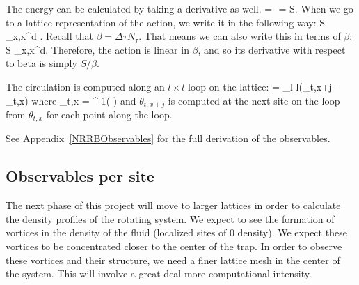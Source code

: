 \documentclass[../../RotatingBosons.tex]{subfiles}
\begin{document}
The energy can be calculated by taking a derivative as well. 
%
\beq
{} = -\frac{\partial}{\partial \beta}\ln \CZ = \frac{\partial}{\partial \beta}S.
\eeq
%
When we go to a lattice representation of the action, we write it in the following way:
%
\beq
S \rightarrow \sum_{x,\tau}\Delta x^{d} \Delta \tau {}.
\eeq 
%
Recall that $\beta = \Delta \tau N_{\tau}$. That means we can also write this in terms of $\beta$:
%
\beq
S \rightarrow {}\sum_{x,\tau}\Delta x^{d}\beta {}.
\eeq 
%
Therefore, the action is linear in $\beta$, and so its derivative with respect to beta is simply $S/\beta$. 

The circulation is computed along an $l \times l$ loop on the lattice:
\beq
\Gamma[l] = \sum_{l \times l}\left(\theta_{t,x+j} - \theta_{t,x}\right) 
\eeq
where 
\beq
\theta_{t,x} = \tan^{-1}\left( \right)
\eeq
and $\theta_{t,x+j}$ is computed at the next site on the loop from $\theta_{t,x}$ for each point along the loop.

See Appendix~\ref{NRRBObservables} for the full derivation of the observables.

\subsection{Observables per site}
The next phase of this project will move to larger lattices in order to calculate the density profiles of the rotating system. We expect to see the formation of vortices in the density of the fluid (localized sites of $0$ density). We expect these vortices to be concentrated closer to the center of the trap. In order to observe these vortices and their structure, we need a finer lattice mesh in the center of the system. This will involve a great deal more computational intensity.
\end{document}
